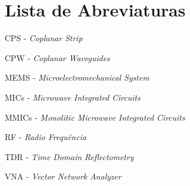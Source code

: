 \chapter*{Lista de Abreviaturas}

CPS \quad- \textit{Coplanar Strip}

CPW	\quad- \textit{Coplanar Waveguides}

MEMS \quad- \textit{Microelectromechanical System}

MICs \quad- \textit{Microwave Integrated Circuits}

MMICs \quad- \textit{Monolitic Microwave Integrated Circuits}

RF \quad- \textit{Radio Frequência}

TDR \quad- \textit{Time Domain Reflectometry}

VNA \quad- \textit{Vector Network Analyzer}